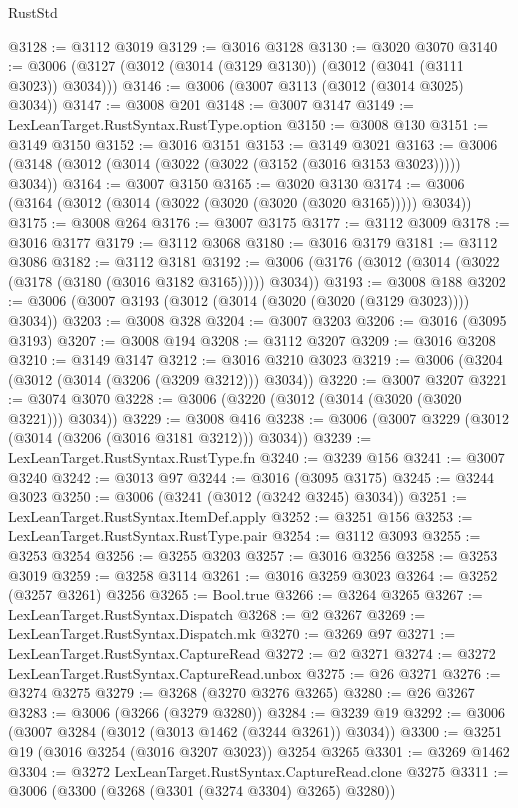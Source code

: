 \begin{lexlean}{RustStd}
\begin{coremodule}
@3128 := @3112 @3019
@3129 := @3016 @3128
@3130 := @3020 @3070
@3140 := @3006 (@3127 (@3012 (@3014 (@3129 @3130)) (@3012 (@3041 (@3111 @3023)) @3034)))
@3146 := @3006 (@3007 @3113 (@3012 (@3014 @3025) @3034))
@3147 := @3008 @201
@3148 := @3007 @3147
@3149 := LexLeanTarget.RustSyntax.RustType.option
@3150 := @3008 @130
@3151 := @3149 @3150
@3152 := @3016 @3151
@3153 := @3149 @3021
@3163 := @3006 (@3148 (@3012 (@3014 (@3022 (@3022 (@3152 (@3016 @3153 @3023))))) @3034))
@3164 := @3007 @3150
@3165 := @3020 @3130
@3174 := @3006 (@3164 (@3012 (@3014 (@3022 (@3020 (@3020 (@3020 @3165))))) @3034))
@3175 := @3008 @264
@3176 := @3007 @3175
@3177 := @3112 @3009
@3178 := @3016 @3177
@3179 := @3112 @3068
@3180 := @3016 @3179
@3181 := @3112 @3086
@3182 := @3112 @3181
@3192 := @3006 (@3176 (@3012 (@3014 (@3022 (@3178 (@3180 (@3016 @3182 @3165))))) @3034))
@3193 := @3008 @188
@3202 := @3006 (@3007 @3193 (@3012 (@3014 (@3020 (@3020 (@3129 @3023)))) @3034))
@3203 := @3008 @328
@3204 := @3007 @3203
@3206 := @3016 (@3095 @3193)
@3207 := @3008 @194
@3208 := @3112 @3207
@3209 := @3016 @3208
@3210 := @3149 @3147
@3212 := @3016 @3210 @3023
@3219 := @3006 (@3204 (@3012 (@3014 (@3206 (@3209 @3212))) @3034))
@3220 := @3007 @3207
@3221 := @3074 @3070
@3228 := @3006 (@3220 (@3012 (@3014 (@3020 (@3020 @3221))) @3034))
@3229 := @3008 @416
@3238 := @3006 (@3007 @3229 (@3012 (@3014 (@3206 (@3016 @3181 @3212))) @3034))
@3239 := LexLeanTarget.RustSyntax.RustType.fn
@3240 := @3239 @156
@3241 := @3007 @3240
@3242 := @3013 @97
@3244 := @3016 (@3095 @3175)
@3245 := @3244 @3023
@3250 := @3006 (@3241 (@3012 (@3242 @3245) @3034))
@3251 := LexLeanTarget.RustSyntax.ItemDef.apply
@3252 := @3251 @156
@3253 := LexLeanTarget.RustSyntax.RustType.pair
@3254 := @3112 @3093
@3255 := @3253 @3254
@3256 := @3255 @3203
@3257 := @3016 @3256
@3258 := @3253 @3019
@3259 := @3258 @3114
@3261 := @3016 @3259 @3023
@3264 := @3252 (@3257 @3261) @3256
@3265 := Bool.true
@3266 := @3264 @3265
@3267 := LexLeanTarget.RustSyntax.Dispatch
@3268 := @2 @3267
@3269 := LexLeanTarget.RustSyntax.Dispatch.mk
@3270 := @3269 @97
@3271 := LexLeanTarget.RustSyntax.CaptureRead
@3272 := @2 @3271
@3274 := @3272 LexLeanTarget.RustSyntax.CaptureRead.unbox
@3275 := @26 @3271
@3276 := @3274 @3275
@3279 := @3268 (@3270 @3276 @3265)
@3280 := @26 @3267
@3283 := @3006 (@3266 (@3279 @3280))
@3284 := @3239 @19
@3292 := @3006 (@3007 @3284 (@3012 (@3013 @1462 (@3244 @3261)) @3034))
@3300 := @3251 @19 (@3016 @3254 (@3016 @3207 @3023)) @3254 @3265
@3301 := @3269 @1462
@3304 := @3272 LexLeanTarget.RustSyntax.CaptureRead.clone @3275
@3311 := @3006 (@3300 (@3268 (@3301 (@3274 @3304) @3265) @3280))

\end{coremodule}
\end{lexlean}
